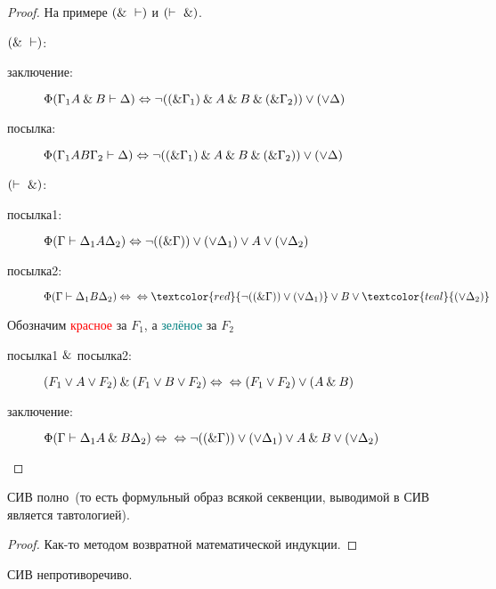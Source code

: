 \documentclass[main]{subfiles}
\begin{document}
\begin{proof}
    На примере $(\and\ \vdash)$ и $(\vdash \ \and)$.

    $(\and \ \vdash)$:

    \begin{description}
        \item[заключение: ] $\Phi(\Gamma_1 A\mathbin{\&} B \vdash \Delta) \Leftrightarrow \lnot((\mathbin{\&}\Gamma_1)\mathbin{\&} A\mathbin{\&} B\mathbin{\&} (\mathbin{\&} \Gamma_2))\lor (\lor\Delta)$
        \item[посылка: ] $\Phi(\Gamma_1 A B \Gamma_2 \vdash \Delta) \Leftrightarrow \lnot ((\mathbin{\&}\Gamma_1)\mathbin{\&} A\mathbin{\&} B\mathbin{\&} (\mathbin{\&} \Gamma_2))\lor (\lor\Delta)$
    \end{description}
    $(\vdash \ \and)$:
    \begin{description}
        \item[посылка1: ] $\Phi(\Gamma \vdash \Delta_1 A \Delta_2)\Leftrightarrow \lnot((\mathbin{\&} \Gamma)) \lor (\lor \Delta_1)\lor A\lor(\lor\Delta_2)$
        \item[посылка2: ] $\Phi(\Gamma \vdash \Delta_1 B \Delta_2)\lra \\ \lra \textcolor{red}{\lnot((\and \Gamma)) \lor (\lor \Delta_1)}\lor B\lor\textcolor{teal}{(\lor\Delta_2)}$
    \end{description}
    Обозначим \textcolor{red}{красное} за $F_1$, а \textcolor{teal}{зелёное} за $F_2$
    \begin{description}
        \item[посылка1 $\mathbin{\&}$ посылка2: ] $(F_1 \lor A \lor F_2) \mathbin{\&} (F_1\lor B\lor F_2) \Leftrightarrow \\ \Leftrightarrow (F_1 \lor F_2) \lor(A \mathbin{\&} B)$
        \item[заключение: ] $\Phi(\Gamma \vdash \Delta_1 A\mathbin{\&} B \Delta_2) \Leftrightarrow \\ \Leftrightarrow \lnot((\mathbin{\&} \Gamma))\lor(\lor\Delta_1)\lor A\mathbin{\&} B \lor(\lor \Delta_2)$
    \end{description}
\end{proof}
\begin{theorem}
    СИВ полно~(то есть формульный образ всякой секвенции, выводимой в СИВ является тавтологией).
\end{theorem}
\begin{proof}
    Как-то методом возвратной математической индукции.
\end{proof}
\begin{theorem}
    СИВ непротиворечиво.
\end{theorem}
\end{document}
